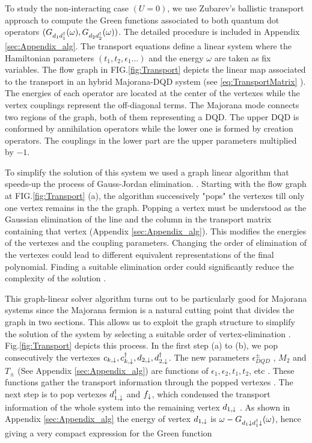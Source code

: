 \documentclass[showpacs,aps,prb,reprint,superscriptaddress]{revtex4-1}
\begin{document}
To study the non-interacting case $(U=0)$, we use Zubarev's ballistic transport approach \cite{zubarev_double-time_1960} to compute the Green functions associated to both quantum dot operators $(G_{d_1d^\dagger_1}(\omega),G_{d_2d^\dagger_2}(\omega))$. The detailed procedure is included in Appendix \ref{sec:Appendix_alg}. The transport equations define a linear system where the Hamiltonian parameters $(t_1,t_2,\epsilon_1 \ldots)$ and the energy $\omega$ are taken as fix variables. The flow graph in FIG.\ref{fig:Transport} depicts the linear map associated to the transport in an hybrid Majorana-DQD system (see \eqref{eq:TransportMatrix} ). The energies of each operator are located at the center of the vertexes while the vertex couplings represent the off-diagonal terms.  The Majorana mode connects two regions of the graph, both of them representing a DQD. The upper DQD is conformed by annihilation operators while the lower one is formed by creation operators. The couplings in the lower part are the  upper parameters multiplied by $-1$. 

To simplify the solution of this system we used a graph linear algorithm  that speeds-up the process of Gauss-Jordan elimination. \cite{spielman_algorithms_2010}. Starting with the flow graph at FIG.\ref{fig:Transport} (a), the algorithm successively "pops"  the vertexes till only one vertex remains in the the graph. Popping a vertex must be understood as the Gaussian elimination of the line and the column in the transport matrix containing that vertex (Appendix \ref{sec:Appendix_alg}). This modifies the energies of the vertexes and the coupling parameters. Changing the order of elimination of the vertexes could lead to different equivalent representations of the final polynomial. Finding a suitable elimination order could significantly reduce the complexity of the solution \cite{spielman_algorithms_2010}.  


This graph-linear solver algorithm turns out to be particularly good for Majorana systems  since the Majorana fermion is a natural cutting point that divides the graph in two sections. This allows us to exploit the graph structure to simplify the solution of the system  by selecting a suitable order of vertex-elimination . Fig.\ref{fig:Transport} depicts this process. In the first step (a) to (b), we pop consecutively the vertexes $c_{k,\downarrow},c_{k,\downarrow}^\dagger , d_{2,\downarrow} , d^\dagger_{2,\downarrow}$. The new parameters $\epsilon^{\pm}_{DQD}$ , $M_2$ and $T_\pm$ (See Appendix \ref{sec:Appendix_alg}) are functions of $\epsilon_1 , \epsilon_2 , t_1,t_2$, etc . These functions gather the transport information  through the popped vertexes . The next step is to pop vertexes $d_{1,\downarrow}^\dagger$ and $f_{\downarrow}$, which condensed the transport information of the whole system into the remaining vertex $d_{1,\downarrow}$ . As shown in Appendix \ref{sec:Appendix_alg} the energy of vertex $d_{1,\downarrow}$ is $\omega - G_{d_1\downarrow d^\dagger_1\downarrow }(\omega) $, hence giving a very compact expression for the Green function
\end{document}
